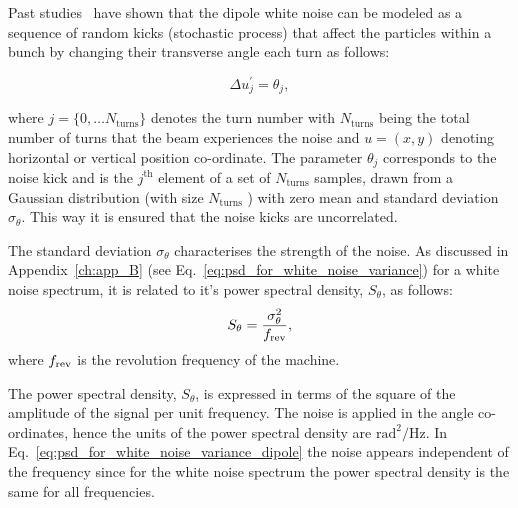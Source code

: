 Past studies~\cite{Lebedev:248620, Lebedev:248622} have shown that the dipole white noise can be modeled as a sequence of random kicks (stochastic process) that affect the particles within a bunch by changing their transverse angle each turn as follows:

\begin{equation}\label{eq:external_noise_kicks}
    \Delta u^\prime_{j} = \theta_j,
\end{equation}

where $j=\{ 0,\dots N_\mathrm{turns} \}$ denotes the turn number with $N_\mathrm{turns}$ being the total number of turns that the beam experiences the noise and $u=(x,y)$ denoting horizontal or vertical position co-ordinate. The parameter $\theta_j$ corresponds to the noise kick and is the $j^\mathrm{th}$ element of a set of $N_\mathrm{turns}$ samples, drawn from a Gaussian distribution (with size $N_\mathrm{turns}$ ) with zero mean and standard deviation $\sigma_\theta$. This way it is ensured that the noise kicks are uncorrelated.

The standard deviation $\sigma_\theta$ characterises the strength of the noise. As discussed in Appendix~\ref{ch:app_B} (see Eq.~\eqref{eq:psd_for_white_noise_variance}) for a white noise spectrum, it is related to it's power spectral density, $S_\theta$, as follows:
\begin{equation}\label{eq:psd_for_white_noise_variance_dipole}
    S_\theta = \frac{\sigma_\theta^2 } {{f_\mathrm{rev}}},
 \end{equation}
where ${f_\mathrm{rev}}$ is the revolution frequency of the machine.

The power spectral density, $S_\theta$, is expressed in terms of the square of the amplitude of the signal per unit frequency. The noise is applied in the angle co-ordinates, hence the units of the power spectral density are $\mathrm{rad^2/Hz}$. In Eq.~\eqref{eq:psd_for_white_noise_variance_dipole} the noise appears independent of the frequency since for the white noise spectrum the power spectral density is the same for all frequencies.


